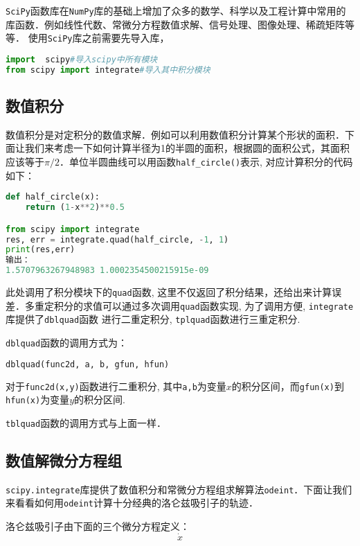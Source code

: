 \verb|SciPy|函数库在\verb|NumPy|库的基础上增加了众多的数学、科学以及工程计算中常用的库函数．例如线性代数、常微分方程数值求解、信号处理、图像处理、稀疏矩阵等等．
使用\verb|SciPy|库之前需要先导入库，
\begin{lstlisting}[language=python]
import  scipy#导入scipy中所有模块
from scipy import integrate#导入其中积分模块
\end{lstlisting}
\subsection{数值积分}
数值积分是对定积分的数值求解．例如可以利用数值积分计算某个形状的面积．下面让我们来考虑一下如何计算半径为1的半圆的面积，根据圆的面积公式，其面积应该等于$\pi/2$．单位半圆曲线可以用函数\verb|half_circle()|表示, 对应计算积分的代码如下：
\begin{lstlisting}[language=python]
def half_circle(x):
    return (1-x**2)**0.5

from scipy import integrate
res, err = integrate.quad(half_circle, -1, 1)
print(res,err)
输出：
1.5707963267948983 1.0002354500215915e-09
\end{lstlisting}
此处调用了积分模块下的\verb|quad|函数, 这里不仅返回了积分结果，还给出来计算误差．多重定积分的求值可以通过多次调用\verb|quad|函数实现, 为了调用方便, \verb|integrate|库提供了\verb|dblquad|函数
进行二重定积分, \verb|tplquad|函数进行三重定积分.

\verb|dblquad|函数的调用方式为：
\begin{lstlisting}[language=python]
dblquad(func2d, a, b, gfun, hfun)
\end{lstlisting}
对于\verb|func2d(x,y)|函数进行二重积分, 其中\verb|a,b|为变量$x$的积分区间，而\verb|gfun(x)|到\verb|hfun(x)|为变量$y$的积分区间.

\verb|tblquad|函数的调用方式与上面一样．

\subsection{数值解微分方程组}
\verb|scipy.integrate|库提供了数值积分和常微分方程组求解算法\verb|odeint|．下面让我们来看看如何用\verb|odeint|计算十分经典的洛仑兹吸引子的轨迹．

洛仑兹吸引子由下面的三个微分方程定义：
\begin{equation}
\dot{x}
\end{equation}
